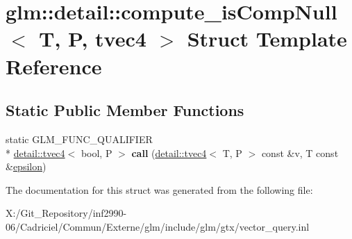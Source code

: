 \hypertarget{structglm_1_1detail_1_1compute__is_comp_null_3_01_t_00_01_p_00_01tvec4_01_4}{\section{glm\-:\-:detail\-:\-:compute\-\_\-is\-Comp\-Null$<$ T, P, tvec4 $>$ Struct Template Reference}
\label{structglm_1_1detail_1_1compute__is_comp_null_3_01_t_00_01_p_00_01tvec4_01_4}
}
\subsection*{Static Public Member Functions}
\begin{DoxyCompactItemize}
\item 
\hypertarget{structglm_1_1detail_1_1compute__is_comp_null_3_01_t_00_01_p_00_01tvec4_01_4_a07a877d176273d44a95922243f035ce8}{static G\-L\-M\-\_\-\-F\-U\-N\-C\-\_\-\-Q\-U\-A\-L\-I\-F\-I\-E\-R \\*
\hyperlink{structglm_1_1detail_1_1tvec4}{detail\-::tvec4}$<$ bool, P $>$ {\bfseries call} (\hyperlink{structglm_1_1detail_1_1tvec4}{detail\-::tvec4}$<$ T, P $>$ const \&v, T const \&\hyperlink{group__gtc__constants_gacb41049b8d22c8aa90e362b96c524feb}{epsilon})}\label{structglm_1_1detail_1_1compute__is_comp_null_3_01_t_00_01_p_00_01tvec4_01_4_a07a877d176273d44a95922243f035ce8}

\end{DoxyCompactItemize}


The documentation for this struct was generated from the following file\-:\begin{DoxyCompactItemize}
\item 
X\-:/\-Git\-\_\-\-Repository/inf2990-\/06/\-Cadriciel/\-Commun/\-Externe/glm/include/glm/gtx/vector\-\_\-query.\-inl\end{DoxyCompactItemize}

